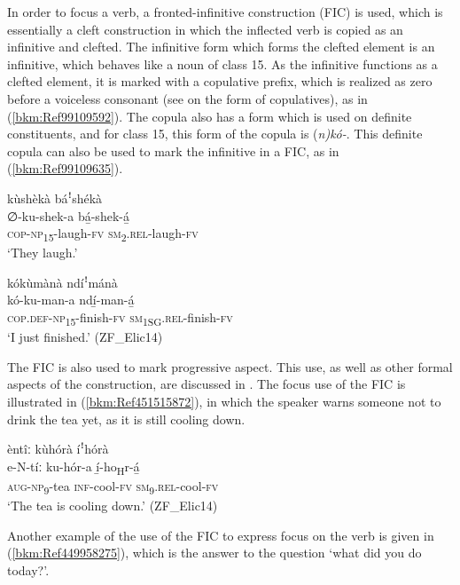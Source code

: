 In order to focus a verb, a fronted-infinitive construction (FIC) is used, which is essentially a cleft construction in which the inflected verb is copied as an infinitive and clefted. The infinitive form which forms the clefted element is an infinitive, which behaves like a noun of class 15. As the infinitive functions as a clefted element, it is marked with a copulative prefix, which is realized as zero before a voiceless consonant (see  on the form of copulatives), as in (\ref{bkm:Ref99109592}). The copula also has a form which is used on definite constituents, and for class 15, this form of the copula is (\textit{n)kó-}. This definite copula can also be used to mark the infinitive in a FIC, as in (\ref{bkm:Ref99109635}).

\ea
\label{bkm:Ref99109592}
kùshèkà báꜝshékà\\
\gll ∅-ku-shek-a    bá̲-shek-á̲\\
\textsc{cop}-\textsc{np}\textsubscript{15}-laugh-\textsc{fv}  \textsc{sm}\textsubscript{2}.\textsc{rel}-laugh-\textsc{fv}\\
\glt ‘They laugh.’
\z

\ea
\label{bkm:Ref99109635}
kókùmànà ndíꜝmánà\\
\gll kó-ku-man-a    ndí̲-man-á̲\\
\textsc{cop}.\textsc{def}-\textsc{np}\textsubscript{15}-finish-\textsc{fv}  \textsc{sm}\textsubscript{1SG}.\textsc{rel}-finish-\textsc{fv}\\
\glt ‘I just finished.’ (ZF\_Elic14)
\z

The FIC is also used to mark progressive aspect. This use, as well as other formal aspects of the construction, are discussed in . The focus use of the FIC is illustrated in (\ref{bkm:Ref451515872}), in which the speaker warns someone not to drink the tea yet, as it is still cooling down.

\ea
\label{bkm:Ref451515872}
èntîː kùhórà íꜝhórà\\
\gll e-N-tíː  ku-hór-a  í̲-ho\textsubscript{H}r-á̲\\
\textsc{aug}-\textsc{np}\textsubscript{9}-tea  \textsc{inf}-cool-\textsc{fv}  \textsc{sm}\textsubscript{9}.\textsc{rel}-cool-\textsc{fv}\\
\glt ‘The tea is cooling down.’ (ZF\_Elic14)
\z

Another example of the use of the FIC to express focus on the verb is given in (\ref{bkm:Ref449958275}), which is the answer to the question ‘what did you do today?’.

